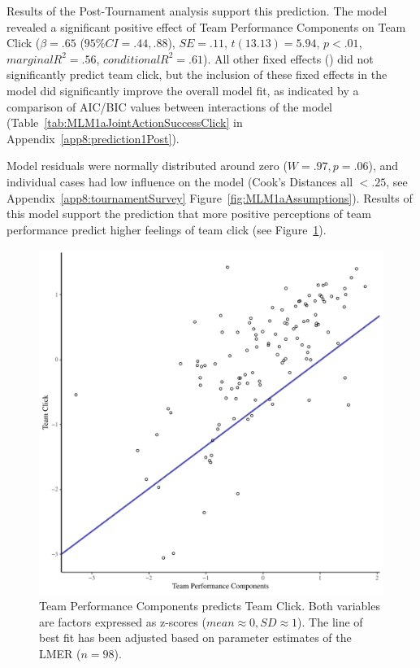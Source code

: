 \begin{CJK}{UTF8}{gbsn}
Results of the Post-Tournament analysis support this prediction. The model revealed a significant positive effect of Team Performance Components on Team Click ($\beta = .65$ ($95\% CI = .44, .88$), $SE = .11$, $t(13.13) = 5.94$, $p < .01$, $marginal R^2 = .56$, $conditional R^2 = .61$).  All other fixed effects () did not significantly predict team click, but the inclusion of these fixed effects in the model did significantly improve the overall model fit, as indicated by a comparison of AIC/BIC values between interactions of the model (Table~\ref{tab:MLM1aJointActionSuccessClick} in Appendix~\ref{app8:prediction1Post}).

Model residuals were normally distributed around zero ($W = .97, p = .06$), and individual cases had low influence on the model (Cook's Distances all $< .25$, see Appendix~\ref{app8:tournamentSurvey} Figure~\ref{fig:MLM1aAssumptions}). Results of this model support the prediction that more positive perceptions of team performance predict higher feelings of team click (see Figure~\ref{fig:jasClickModelSLope}).

\begin{figure}[htbp]
  \centering
\includegraphics[scale = .5]{images/jasClickModelSlope}
  \caption{Team Performance Components predicts Team Click. Both variables are factors expressed as z-scores ($mean \approx 0, SD \approx 1$).  The line of best fit has been adjusted based on parameter estimates of the LMER ($n = 98$).}
  \label{fig:jasClickModelSLope}
\end{figure}




\end{CJK}
